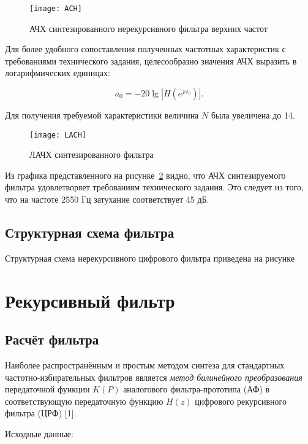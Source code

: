 \begin{figure}[h!]
  \label{f:1}
  \texttt{[image: ACH]}
  \caption{АЧХ синтезированного нерекурсивного фильтра верхних частот}
\end{figure}

Для более удобного сопоставления полученных частотных характеристик с
требованиями технического задания, целесообразно значения АЧХ выразить
в логарифмических единицах:

\begin{equation*}
  a_0 = -20 \lg\left|H(e^{j \omega_0})\right|.
\end{equation*}

Для получения требуемой характеристики величина $N$ была увеличена до 14.

\begin{figure}[h!]
  \label{f:2}
  \texttt{[image: LACH]}
  \caption{ЛАЧХ синтезированного фильтра}
\end{figure}


Из графика представленного на рисунке~\ref{f:2} видно, что АЧХ синтезируемого
фильтра удовлетворяет требованиям технического задания. Это следует из
того, что на частоте 2550 Гц затухание соответствует 45 дБ.

\subsection{Структурная схема фильтра}

Структурная схема нерекурсивного цифрового фильтра приведена на 
рисунке

\newpage

\section{Рекурсивный фильтр}
\label{sec:rekurs}

\subsection{Расчёт фильтра}

\point Наиболее распространённым и простым методом синтеза для
стандартных частотно-избирательных фильтров является \textit{метод билинейного
преобразования} передаточной функции $K(P)$ аналогового фильтра-прототипа
(АФ) в соответствующую передаточную функцию $H(z)$ цифрового
рекурсивного фильтра (ЦРФ) [1].

\point Исходные данные:

